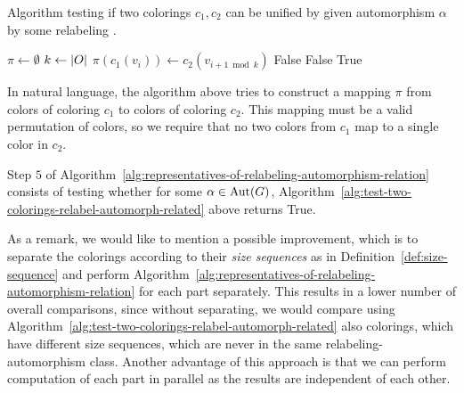\begin{algorithm}[H]
    \caption{Algorithm testing if two colorings $c_1, c_2$ can be unified by given automorphism $\alpha$ by some relabeling \pi.} 
    \begin{algorithmic}[1]
            \State $\pi \gets \emptyset$
                \State $k \gets \left|{O}\right|$
                            \State $\pi(c_1(v_i)) \gets c_2(v_{i + 1 \bmod k})$
                        \Else
                            \State \Return False
                        \EndIf
                    \Else
                            \State \Return False
                        \EndIf
                    \EndIf
                \EndFor
            \EndFor
            \State \Return True
        \EndFunction
    \end{algorithmic}
    \label{alg:test-two-colorings-relabel-automorph-related}
\end{algorithm}

In natural language, the algorithm above tries to construct a mapping $\pi$ from colors of coloring $c_1$ to colors of coloring $c_2$. This mapping must be a valid permutation of colors, so we require that no two colors from $c_1$ map to a single color in $c_2$.

Step $5$ of Algorithm~\ref{alg:representatives-of-relabeling-automorphism-relation} consists of testing whether for some $\alpha \in \operatorname{Aut}(G)$, Algorithm~\ref{alg:test-two-colorings-relabel-automorph-related} above returns True.

As a remark, we would like to mention a possible improvement, which is to separate the colorings according to their \textit{ size sequences} as in Definition~\ref{def:size-sequence} and perform Algorithm~\ref{alg:representatives-of-relabeling-automorphism-relation} for each part separately. This results in a lower number of overall comparisons, since without separating, we would compare using Algorithm~\ref{alg:test-two-colorings-relabel-automorph-related} also colorings, which have different size sequences, which are never in the same relabeling-automorphism class. Another advantage of this approach is that we can perform computation of each part in parallel as the results are independent of each other.

